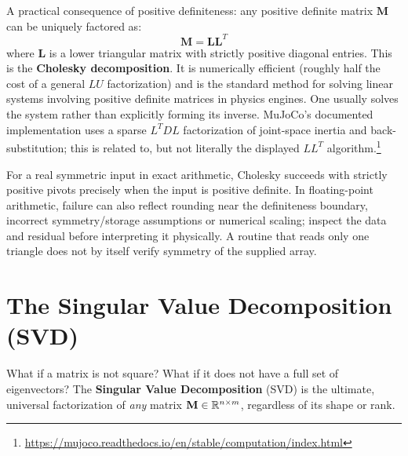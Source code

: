 A practical consequence of positive definiteness: any positive definite matrix $\mathbf{M}$ can be uniquely factored as:
\begin{equation}
    \mathbf{M} = \mathbf{L}\mathbf{L}^T
\end{equation}
where $\mathbf{L}$ is a lower triangular matrix with strictly positive diagonal entries. This is the \textbf{Cholesky decomposition}. It is numerically efficient (roughly half the cost of a general $LU$ factorization) and is the standard method for solving linear systems involving positive definite matrices in physics engines. One usually solves the system rather than explicitly forming its inverse. MuJoCo's documented implementation uses a sparse $L^TDL$ factorization of joint-space inertia and back-substitution; this is related to, but not literally the displayed $LL^T$ algorithm.\footnote{\url{https://mujoco.readthedocs.io/en/stable/computation/index.html}}

For a real symmetric input in exact arithmetic, Cholesky succeeds with strictly positive pivots precisely when the input is positive definite. In floating-point arithmetic, failure can also reflect rounding near the definiteness boundary, incorrect symmetry/storage assumptions or numerical scaling; inspect the data and residual before interpreting it physically. A routine that reads only one triangle does not by itself verify symmetry of the supplied array.

\section{The Singular Value Decomposition (SVD)}
\label{sec:svd}

What if a matrix is not square? What if it does not have a full set of eigenvectors? The \textbf{Singular Value Decomposition} (SVD) is the ultimate, universal factorization of \emph{any} matrix $\mathbf{M} \in \mathbb{R}^{n \times m}$, regardless of its shape or rank.

